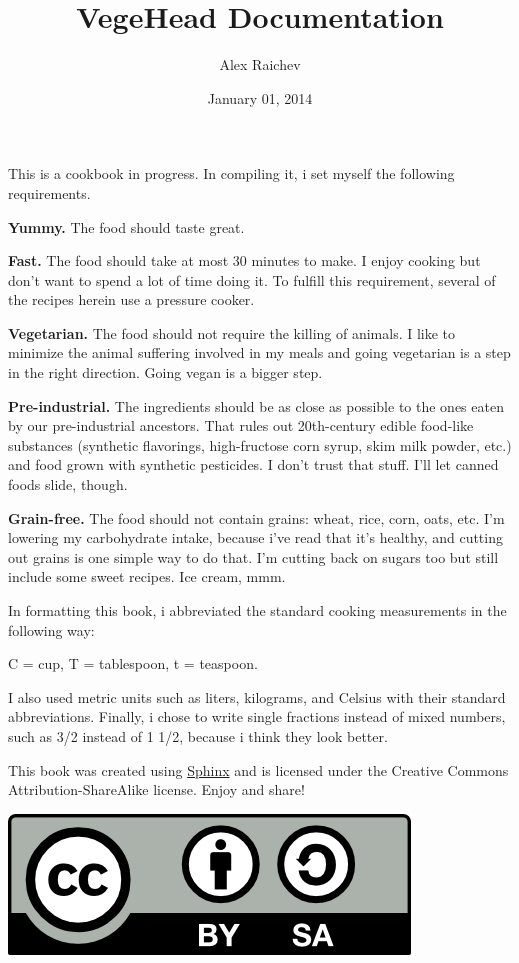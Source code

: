 \documentclass[letterpaper,10pt,english]{sphinxmanual}
\title{VegeHead Documentation}
\date{January 01, 2014}
\author{Alex Raichev}
\begin{document}
\maketitle
\tableofcontents
{}\label{index::doc}


This is a cookbook in progress. In compiling it, i set myself the following requirements.

\textbf{Yummy.} The food should taste great.

\textbf{Fast.} The food should take at most 30 minutes to make. I enjoy cooking but don’t want to spend a lot of time doing it. To fulfill this requirement, several of the recipes herein use a pressure cooker.

\textbf{Vegetarian.} The food should not require the killing of animals. I like to minimize the animal suffering involved in my meals and going vegetarian is a step in the right direction. Going vegan is a bigger step.

\textbf{Pre-industrial.} The ingredients should be as close as possible to the ones eaten by our pre-industrial ancestors. That rules out 20th-century edible food-like substances (synthetic flavorings, high-fructose corn syrup, skim milk powder, etc.) and food grown with synthetic pesticides. I don’t trust that stuff. I’ll let canned foods slide, though.

\textbf{Grain-free.} The food should not contain grains: wheat, rice, corn, oats, etc. I’m lowering my carbohydrate intake, because i’ve read that it’s healthy, and cutting out grains is one simple way to do that. I’m cutting back on sugars too but still include some sweet recipes. Ice cream, mmm.

In formatting this book, i abbreviated the standard cooking measurements in the following way:

C = cup, T = tablespoon, t = teaspoon.

I also used metric units such as liters, kilograms, and Celsius with their standard abbreviations. Finally, i chose to write single fractions instead of mixed numbers, such as 3/2 instead of 1 1/2, because i think they look better.

This book was created using \href{http://sphinx.pocoo.org/}{Sphinx} and is licensed under the Creative Commons Attribution-ShareAlike license. Enjoy and share!

\includegraphics{by-sa.png}
\end{document}
